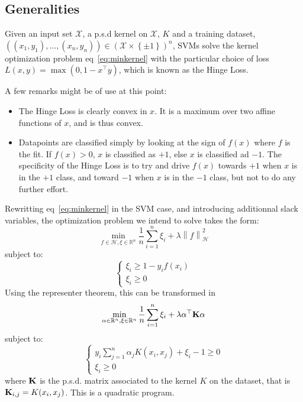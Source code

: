 \documentclass[a4paper, 11pt]{article}
\newcommand{\X}{\mathcal{X}}
\newcommand{\R}{\mathbb{R}}
\newcommand{\K}{\bold{K}}
\newcommand{\Hilb}{\mathcal{H}}
\newcommand{\x}{x_i}
\newcommand{\pmset}{\left\{\pm1\right\}}
\newcommand{\normh}[1]{\left\| #1 \right\|_\Hilb}
\begin{document}
\subsection{Generalities}
Given an input set $\X$, a p.s.d kernel on $\X$, $K$ and a training dataset,
$((x_1, y_1), \dots, (x_n, y_n)) \in (\X \times \pmset)^n$, SVMs solve the
kernel optimization problem eq~\ref{eq:minkernel} with the particular choice of
loss $L(x, y) = \max(0, 1 - x^\top y)$, which is known as the Hinge Loss.

A few remarks might be of use at this point:
\begin{itemize}
  \item The Hinge Loss is clearly convex in $x$. It is a maximum over two affine
    functions of $x$, and is thus convex.
  \item Datapoints are classified simply by looking at the sign of $f(x)$ where
    $f$ is the fit. If $f(x) > 0$, $x$ is classified as $+1$, else $x$ is classified
    ad $-1$. The specificity of the Hinge Loss is to try and drive $f(x)$ towards $+1$
    when $x$ is in the $+1$ class, and toward $-1$ when $x$ is in the $-1$ class, but not
    to do any further effort.
\end{itemize}
Rewritting eq~\ref{eq:minkernel} in the SVM case, and introducing
additionnal slack variables, the optimization problem we intend to
solve takes the form:
\begin{equation}
  \min\limits_{f\in\Hilb,\xi\in\R^n}
  \frac{1}{n}\sum\limits_{i=1}^n\xi_i + \lambda \normh{f}^2
\end{equation}
subject to:
\begin{equation}
  \begin{cases}
    \xi_i \geq 1 - y_i f(x_i)\\
    \xi_i \geq 0
  \end{cases}
\end{equation}
Using the representer theorem, this can be transformed in
\begin{equation}
  \min_{\alpha\in\R^n, \xi\in\R^n}
  \frac{1}{n}\sum\limits_{i=1}^n\xi_i
  + \lambda \alpha^\top \K \alpha
\end{equation}
subject to:
\begin{equation}
  \begin{cases}
    y_i\sum\limits_{j=1}^n\alpha_jK(\x, x_j) + \xi_i - 1 \geq 0\\
    \xi_i \geq 0
  \end{cases}
\end{equation}
where $\K$ is the p.s.d. matrix associated to the kernel $K$ on
the dataset, that is $\K_{i,j} = K(\x, x_j)$. This is a quadratic
program.
\end{document}
